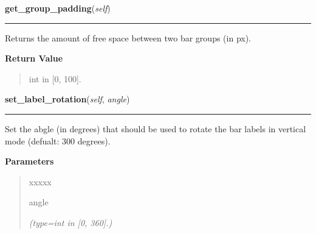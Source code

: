     \label{pygtk_chart:multi_bar_chart:MultiBarChart:get_group_padding}

    \vspace{0.5ex}

\hspace{.8\funcindent}\begin{boxedminipage}{\funcwidth}

    \raggedright \textbf{get\_group\_padding}(\textit{self})

    \vspace{-1.5ex}

    \rule{\textwidth}{0.5\fboxrule}
\setlength{\parskip}{2ex}
    Returns the amount of free space between two bar groups (in px).

\setlength{\parskip}{1ex}
      \textbf{Return Value}
    \vspace{-1ex}

      \begin{quote}
      int in [0, 100].

      \end{quote}

    \end{boxedminipage}

    \label{pygtk_chart:multi_bar_chart:MultiBarChart:set_label_rotation}

    \vspace{0.5ex}

\hspace{.8\funcindent}\begin{boxedminipage}{\funcwidth}

    \raggedright \textbf{set\_label\_rotation}(\textit{self}, \textit{angle})

    \vspace{-1.5ex}

    \rule{\textwidth}{0.5\fboxrule}
\setlength{\parskip}{2ex}
    Set the abgle (in degrees) that should be used to rotate the bar labels
    in vertical mode (defualt: 300 degrees).

\setlength{\parskip}{1ex}
      \textbf{Parameters}
      \vspace{-1ex}

      \begin{quote}
        \begin{Ventry}{xxxxx}

          \item[angle]

            {\it (type=int in [0, 360].)}

        \end{Ventry}

      \end{quote}

    \end{boxedminipage}

